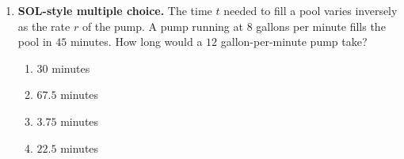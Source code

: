 \documentclass[10pt]{article}
\begin{document}
\begin{enumerate}[leftmargin=1.8em, itemsep=9pt]
  \item \textbf{SOL-style multiple choice.} The time $t$ needed to fill a pool varies inversely as the
        rate $r$ of the pump. A pump running at $8$ gallons per minute fills the pool in $45$ minutes.
        How long would a $12$ gallon-per-minute pump take?
        \vspace{-6pt}
        \begin{enumerate}[label=\Alph*., leftmargin=1.9em, itemsep=1pt]
          \item $30$ minutes
          \item $67.5$ minutes
          \item $3.75$ minutes
          \item $22.5$ minutes
        \end{enumerate}
\end{enumerate}
\end{document}
